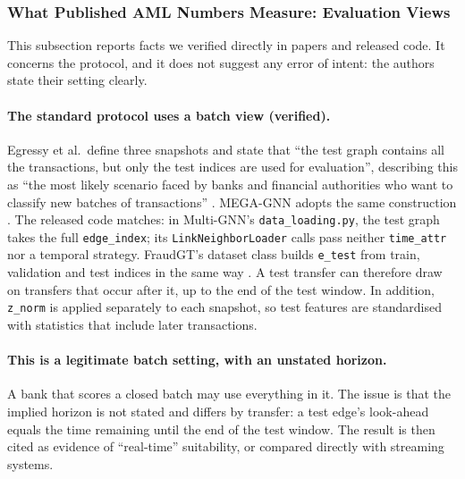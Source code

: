 \documentclass[11pt,a4paper]{article}
\begin{document}
\subsubsection{What Published AML Numbers Measure: Evaluation Views}
\label{sec:evaluation_views}
This subsection reports facts we verified directly in papers and released code. It concerns the protocol, and it does not suggest any error of intent: the authors state their setting clearly.

\paragraph{The standard protocol uses a batch view (verified).} Egressy et al.\ define three snapshots and state that ``the test graph contains all the transactions, but only the test indices are used for evaluation'', describing this as ``the most likely scenario faced by banks and financial authorities who want to classify new batches of transactions'' \cite{egressy2024multigraph}. MEGA-GNN adopts the same construction \cite{bilgi2026mega}. The released code matches: in Multi-GNN's \texttt{data\_loading.py}, the test graph takes the full \texttt{edge\_index}; its \texttt{LinkNeighborLoader} calls pass neither \texttt{time\_attr} nor a temporal strategy. FraudGT's dataset class builds \texttt{e\_test} from train, validation and test indices in the same way \cite{lin2024fraudgt}. A test transfer can therefore draw on transfers that occur after it, up to the end of the test window. In addition, \texttt{z\_norm} is applied separately to each snapshot, so test features are standardised with statistics that include later transactions.

\paragraph{This is a legitimate batch setting, with an unstated horizon.} A bank that scores a closed batch may use everything in it. The issue is that the implied horizon is not stated and differs by transfer: a test edge's look-ahead equals the time remaining until the end of the test window. The result is then cited as evidence of ``real-time'' suitability, or compared directly with streaming systems.
\end{document}
